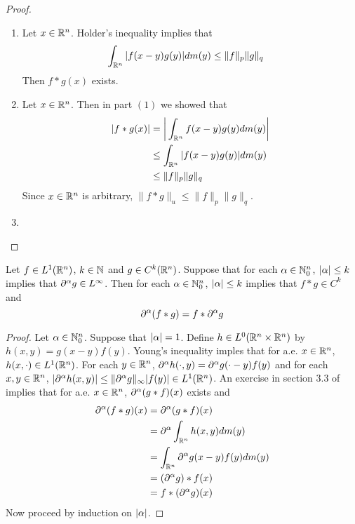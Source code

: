 \documentclass{book}
\begin{document}
	\begin{proof}
	\begin{enumerate}
	\item Let $x \in \mathbb{R}^n$. Holder's inequality implies that 
	\begin{align*}
	\int_{\mathbb{R}^n}|f(x-y)g(y)| dm(y) 
	& \leq \|f\|_p \|g\|_q 
	\end{align*}
	Then $f*g(x)$ exists. 
	\item Let $x \in \mathbb{R}^n$. Then in part $(1)$ we showed that  
	\begin{align*}
	|f*g(x)| 
	&= \bigg| \int_{\mathbb{R}^n} f(x - y)g(y) dm(y)\bigg| \\
	&\leq  \int_{\mathbb{R}^n} |f(x-y)g(y)| dm(y) \\
	& \leq \|f\|_p \|g\|_q
	\end{align*}
	Since $x \in \mathbb{R}^n$ is arbitrary, $\|f*g\|_u \leq \|f\|_p \|g\|_q $.
	\item 
	\end{enumerate}
	\end{proof}
	
	\begin{ex}
	 Let $f \in L^1(\mathbb{R}^n)$, $k \in \mathbb{N}$ and $g \in C^k(\mathbb{R}^n)$. Suppose that for each $\alpha \in \mathbb{N}_0^n$, $|\alpha| \leq k$ implies that $\partial^{\alpha} g \in L^{\infty}$. Then for each $\alpha \in \mathbb{N}_0^n$, $|\alpha| \leq k$ implies that $f *  g \in C^{k}$ and $$\partial^{\alpha}(f*g) = f*\partial^{\alpha}g$$
	\end{ex}
	
	\begin{proof}
	Let $\alpha \in \mathbb{N}_0^n$. Suppose that $|\alpha| = 1$. Define $h \in L^0(\mathbb{R}^n \times \mathbb{R}^n)$ by $h(x,y) = g(x-y)f(y)$. Young's inequality imples that for a.e. $ x \in \mathbb{R}^n$, $h(x, \cdot) \in L^1(\mathbb{R}^n)$. For each $y \in \mathbb{R}^n$, $\partial^{\alpha} h (\cdot,y) = \partial^{\alpha}g(\cdot -y)f(y)$ and for each $x,y \in \mathbb{R}^n$, $|\partial^{\alpha} h (x,y)| \leq \|\partial^{\alpha} g\|_{\infty}|f(y)| \in L^1(\mathbb{R}^n)$. An exercise in section $3.3$ of 
	\cite{measure}
	implies that for a.e. $x \in \mathbb{R}^n$, $\partial^{\alpha} (g*f)(x)$ exists and 
	\begin{align*}
	\partial^{\alpha} (f*g)(x) 
	&= \partial^{\alpha} (g * f)(x) \\
	&= \partial^{\alpha}\int_{\mathbb{R}^n} h(x,y) dm(y) \\
	&= \int_{\mathbb{R}^n} \partial^{\alpha} g(x -y)f(y) dm(y) \\
	&= (\partial^{\alpha} g) * f (x) \\
	&=  f * (\partial^{\alpha} g) (x)   
	\end{align*}	 
	Now proceed by induction on $|\alpha|$.
	\end{proof}
	
\end{document}
